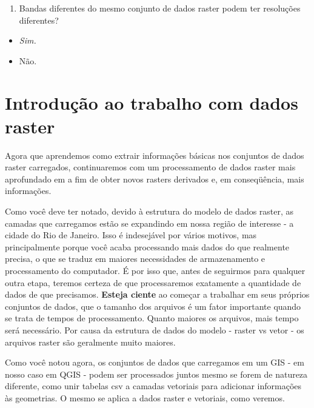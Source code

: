 \documentclass[
  portuguese,
]{krantz}
\providecommand{\tightlist}{%
  \setlength{\itemsep}{0pt}\setlength{\parskip}{0pt}}
\begin{document}
\begin{enumerate}
\def\labelenumi{\arabic{enumi}.}
\setcounter{enumi}{2}
\tightlist
\item
  Bandas diferentes do mesmo conjunto de dados raster podem ter resoluções diferentes?
\end{enumerate}

\begin{itemize}
\tightlist
\item
  \emph{Sim.}
\item
  Não.
\end{itemize}

\hypertarget{introduuxe7uxe3o-ao-trabalho-com-dados-raster}{%
\section{Introdução ao trabalho com dados raster}\label{introduuxe7uxe3o-ao-trabalho-com-dados-raster}}

Agora que aprendemos como extrair informações básicas nos conjuntos de dados raster carregados, continuaremos com um processamento de dados raster mais aprofundado em a fim de obter novos rasters derivados e, em conseqüência, mais informações.

Como você deve ter notado, devido à estrutura do modelo de dados raster, as camadas que carregamos estão se expandindo em nossa região de interesse - a cidade do Rio de Janeiro. Isso é indesejável por vários motivos, mas principalmente porque você acaba processando mais dados do que realmente precisa, o que se traduz em maiores necessidades de armazenamento e processamento do computador. É por isso que, antes de seguirmos para qualquer outra etapa, teremos certeza de que processaremos exatamente a quantidade de dados de que precisamos. \textbf{Esteja ciente} ao começar a trabalhar em seus próprios conjuntos de dados, que o tamanho dos arquivos é um fator importante quando se trata de tempos de processamento. Quanto maiores os arquivos, mais tempo será necessário. Por causa da estrutura de dados do modelo - raster vs vetor - os arquivos raster são geralmente muito maiores.

Como você notou agora, os conjuntos de dados que carregamos em um GIS - em nosso caso em QGIS - podem ser processados \hspace{0pt}\hspace{0pt}juntos mesmo se forem de natureza diferente, como unir tabelas csv a camadas vetoriais para adicionar informações às geometrias. O mesmo se aplica a dados raster e vetoriais, como veremos.
\end{document}
